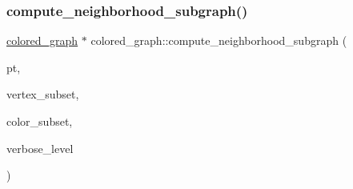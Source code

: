 \subsubsection{\texorpdfstring{compute\+\_\+neighborhood\+\_\+subgraph()}{compute\_neighborhood\_subgraph()}}
{\footnotesize\ttfamily \mbox{\hyperlink{classcolored__graph}{colored\+\_\+graph}} $\ast$ colored\+\_\+graph\+::compute\+\_\+neighborhood\+\_\+subgraph (\begin{DoxyParamCaption}\item[{\mbox{\hyperlink{galois_8h_a09fddde158a3a20bd2dcadb609de11dc}{I\+NT}}}]{pt,  }\item[{\mbox{\hyperlink{classfancy__set}{fancy\+\_\+set}} $\ast$\&}]{vertex\+\_\+subset,  }\item[{\mbox{\hyperlink{classfancy__set}{fancy\+\_\+set}} $\ast$\&}]{color\+\_\+subset,  }\item[{\mbox{\hyperlink{galois_8h_a09fddde158a3a20bd2dcadb609de11dc}{I\+NT}}}]{verbose\+\_\+level }\end{DoxyParamCaption})}

\mbox{\label{classcolored__graph_a8f463f37779583b7d4fed1ac35097c2c}} 
